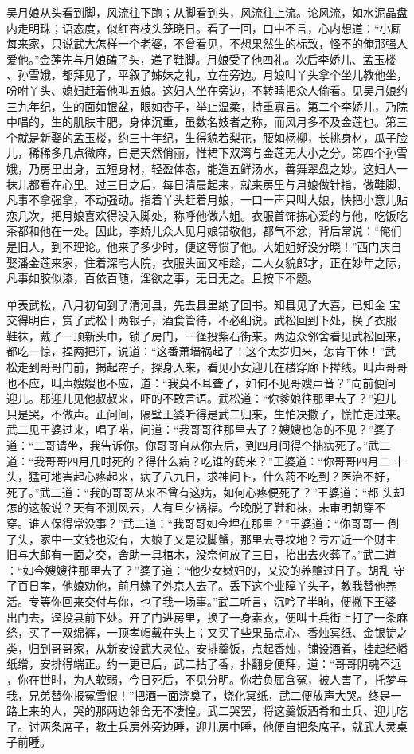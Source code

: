 吴月娘从头看到脚，风流往下跑；从脚看到头，风流往上流。论风流，如水泥晶盘
内走明珠；语态度，似红杏枝头笼晓日。看了一回，口中不言，心内想道：“小厮
每来家，只说武大怎样一个老婆，不曾看见，不想果然生的标致，怪不的俺那强人
爱他。”金莲先与月娘磕了头，递了鞋脚。月娘受了他四礼。次后李娇儿、孟玉楼
、孙雪娥，都拜见了，平叙了姊妹之礼，立在旁边。月娘叫丫头拿个坐儿教他坐，
吩咐丫头、媳妇赶着他叫五娘。这妇人坐在旁边，不转睛把众人偷看。见吴月娘约
三九年纪，生的面如银盆，眼如杏子，举止温柔，持重寡言。第二个李娇儿，乃院
中唱的，生的肌肤丰肥，身体沉重，虽数名妓者之称，而风月多不及金莲也。第三
个就是新娶的孟玉楼，约三十年纪，生得貌若梨花，腰如杨柳，长挑身材，瓜子脸
儿，稀稀多几点微麻，自是天然俏丽，惟裙下双湾与金莲无大小之分。第四个孙雪
娥，乃房里出身，五短身材，轻盈体态，能造五鲜汤水，善舞翠盘之妙。这妇人一
抹儿都看在心里。过三日之后，每日清晨起来，就来房里与月娘做针指，做鞋脚，
凡事不拿强拿，不动强动。指着丫头赶着月娘，一口一声只叫大娘，快把小意儿贴
恋几次，把月娘喜欢得没入脚处，称呼他做六姐。衣服首饰拣心爱的与他，吃饭吃
茶都和他在一处。因此，李娇儿众人见月娘错敬他，都气不忿，背后常说：“俺们
是旧人，到不理论。他来了多少时，便这等惯了他。大姐姐好没分晓！”西门庆自
娶潘金莲来家，住着深宅大院，衣服头面又相趁，二人女貌郎才，正在妙年之际，
凡事如胶似漆，百依百随，淫欲之事，无日无之。且按下不题。

单表武松，八月初旬到了清河县，先去县里纳了回书。知县见了大喜，已知金
宝交得明白，赏了武松十两银子，酒食管待，不必细说。武松回到下处，换了衣服
鞋袜，戴了一顶新头巾，锁了房门，一径投紫石街来。两边众邻舍看见武松回来，
都吃一惊，捏两把汗，说道：“这番萧墙祸起了！这个太岁归来，怎肯干休！”武
松走到哥哥门前，揭起帘子，探身入来，看见小女迎儿在楼穿廊下撵线。叫声哥哥
也不应，叫声嫂嫂也不应，道：“我莫不耳聋了，如何不见哥嫂声音？”向前便问
迎儿。那迎儿见他叔叔来，吓的不敢言语。武松道：“你爹娘往那里去了？”迎儿
只是哭，不做声。正问间，隔壁王婆听得是武二归来，生怕决撒了，慌忙走过来。
武二见王婆过来，唱了喏，问道：“我哥哥往那里去了？嫂嫂也怎的不见？”婆子
道：“二哥请坐，我告诉你。你哥哥自从你去后，到四月间得个拙病死了。”武二
道：“我哥哥四月几时死的？得什么病？吃谁的药来？”王婆道：“你哥哥四月二
十头，猛可地害起心疼起来，病了八九日，求神问卜，什么药不吃到？医治不好，
死了。”武二道：“我的哥哥从来不曾有这病，如何心疼便死了？”王婆道：“都
头却怎的这般说？天有不测风云，人有旦夕祸福。今晚脱了鞋和袜，未审明朝穿不
穿。谁人保得常没事？”武二道：“我哥哥如今埋在那里？”王婆道：“你哥哥一
倒了头，家中一文钱也没有，大娘子又是没脚蟹，那里去寻坟地？亏左近一个财主
旧与大郎有一面之交，舍助一具棺木，没奈何放了三日，抬出去火葬了。”武二道
：“如今嫂嫂往那里去了？”婆子道：“他少女嫩妇的，又没的养赡过日子。胡乱
守了百日孝，他娘劝他，前月嫁了外京人去了。丢下这个业障丫头子，教我替他养
活。专等你回来交付与你，也了我一场事。”武二听言，沉吟了半晌，便撇下王婆
出门去，迳投县前下处。开了门进房里，换了一身素衣，便叫土兵街上打了一条麻
绦，买了一双绵裤，一顶孝帽戴在头上；又买了些果品点心、香烛冥纸、金银锭之
类，归到哥哥家，从新安设武大灵位。安排羹饭，点起香烛，铺设酒肴，挂起经幡
纸缯，安排得端正。约一更已后，武二拈了香，扑翻身便拜，道：“哥哥阴魂不远
，你在世时，为人软弱，今日死后，不见分明。你若负屈含冤，被人害了，托梦与
我，兄弟替你报冤雪恨！”把酒一面浇奠了，烧化冥纸，武二便放声大哭。终是一
路上来的人，哭的那两边邻舍无不凄惶。武二哭罢，将这羹饭酒肴和土兵、迎儿吃
了。讨两条席子，教土兵房外旁边睡，迎儿房中睡，他便自把条席子，就武大灵桌
子前睡。

